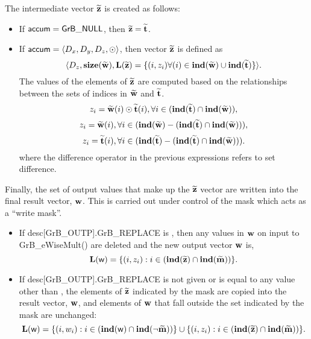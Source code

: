 The intermediate vector ${\bf \widetilde{z}}$ is created as follows:
\begin{itemize}
    \item If ${\sf accum} = {\sf GrB\_NULL}$, then ${\bf \widetilde{z}} = {\bf \widetilde{t}}$.

    \item If ${\sf accum} = \langle D_x, D_y, D_z, \odot \rangle$, then vector ${\bf \widetilde{z}}$ is defined as 
        \[ \langle D_z, \bold{size}({\bf \widetilde{w}}), \bold{L}({\bf \widetilde{z}})
		= \{(i,z_{i})  \forall (i) \in \bold{ind}({\bf \widetilde{w}}) \cup 
        \bold{ind}({\bf \widetilde{t}}) \} \rangle.\]
    The values of the elements of ${\bf \widetilde{z}}$ are computed based on the relationships between the sets of indices in ${\bf \widetilde{w}}$ and ${\bf \widetilde{t}}$.
\[
z_{i} = {\bf \widetilde{w}}(i) \odot {\bf \widetilde{t}}(i), \forall i \in  (\bold{ind}({\bf \widetilde{t}}) \cap \bold{ind}({\bf \widetilde{w}})),
\]
\[
z_{i} = {\bf \widetilde{w}}(i), \forall i \in  (\bold{ind}({\bf \widetilde{w}}) - (\bold{ind}({\bf \widetilde{t}}) \cap \bold{ind}({\bf \widetilde{w}}))),
\]
\[
z_{i} = {\bf \widetilde{t}}(i), \forall i \in  (\bold{ind}({\bf \widetilde{t}}) - (\bold{ind}({\bf \widetilde{t}}) \cap \bold{ind}({\bf \widetilde{w}}))).
\]
where the difference operator in the previous expressions refers to set difference.
\end{itemize}

Finally, the set of output values that make up the ${\bf \widetilde{z}}$ 
vector are written into the final result vector, ${\bf w}$. 
This is carried out under control of the mask which acts as a ``write mask''.
\begin{itemize}
\item If {\sf desc[GrB\_OUTP].GrB\_REPLACE} is \true, then any values in ${\bf w}$ 
on input to {\sf GrB\_eWiseMult()} are deleted and the new output vector ${\bf w}$ is,
\[ \bold{L}({\sf w}) = \{(i,z_{i}) : i \in (\bold{ind}({\bf \widetilde{z}}) 
\cap \bold{ind}({\bf \widetilde{m}})) \}. \]

\item If {\sf desc[GrB\_OUTP].GrB\_REPLACE} is not given or is equal to any 
value other than \true, the elements of ${\bf \widetilde{z}}$ indicated by 
the mask are copied into the result vector, ${\bf w}$, and elements of 
${\bf w}$ that fall outside the set indicated by the mask are unchanged:
\[ \bold{L}({\sf w}) = \{(i,w_{i}) : i \in (\bold{ind}({\bf \sf w}) 
\cap \bold{ind}(\neg {\bf \widetilde{m}})) \} \cup \{(i,z_{i}) : i \in 
(\bold{ind}({\bf \widetilde{z}}) \cap \bold{ind}({\bf \widetilde{m}})) \}. \]
\end{itemize}

